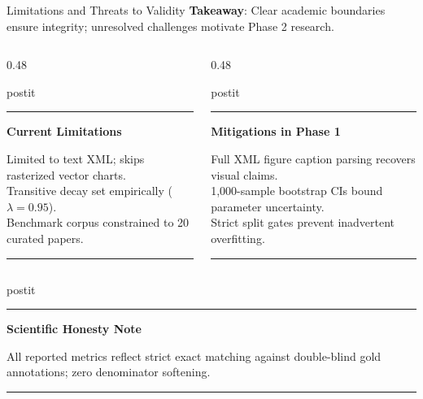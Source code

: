 \documentclass[aspectratio=43,10pt]{beamer}
\newcommand{\card}[4][\linewidth]{%
  \begin{beamercolorbox}[wd=#1,sep=0pt,rounded=false,shadow=false]{postit}%
    {\color{#3}\rule{\linewidth}{1.5pt}}\par
    \colorbox{slatebg}{%
      \begin{minipage}{\dimexpr#1-8pt\relax}%
        \vspace{1.5pt}%
        {\footnotesize\bfseries\color{#3}#2}\vspace{1.5pt}\par%
        {\scriptsize\color{darktext}#4}%
        \vspace{1.5pt}%
      \end{minipage}%
    }%
    \par{\color{bordergray}\rule{\linewidth}{0.6pt}}%
  \end{beamercolorbox}%
}
\begin{document}
\begin{frame}{Limitations and Threats to Validity}
  \textbf{Takeaway}: Clear academic boundaries ensure integrity; unresolved challenges motivate Phase 2 research.
  \vspace{0.15cm}
  \begin{columns}[T]
    \begin{column}{0.48\textwidth}
      \card{Current Limitations}{amber}{
        \textbullet{} Limited to text XML; skips rasterized vector charts.\\
        \textbullet{} Transitive decay set empirically ($\lambda = 0.95$).\\
        \textbullet{} Benchmark corpus constrained to 20 curated papers.
      }
    \end{column}
    \begin{column}{0.48\textwidth}
      \card{Mitigations in Phase 1}{teal}{
        \textbullet{} Full XML figure caption parsing recovers visual claims.\\
        \textbullet{} 1,000-sample bootstrap CIs bound parameter uncertainty.\\
        \textbullet{} Strict split gates prevent inadvertent overfitting.
      }
    \end{column}
  \end{columns}
  \vspace{0.15cm}
  \card{Scientific Honesty Note}{navy}{
    All reported metrics reflect strict exact matching against double-blind gold annotations; zero denominator softening.
  }
\end{frame}
\end{document}
